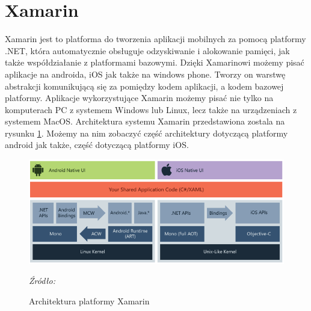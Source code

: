\documentclass[12pt,twoside]{report}
\begin{document}
\section{Xamarin}
Xamarin jest to platforma do tworzenia aplikacji mobilnych za pomocą platformy .NET, która automatycznie obsługuje odzyskiwanie i alokowanie pamięci, jak także współdziałanie z platformami bazowymi. Dzięki Xamarinowi możemy pisać aplikacje na androida, iOS jak także na windows phone. Tworzy on warstwę abstrakcji komunikującą się za pomiędzy kodem aplikacji, a kodem bazowej platformy. Aplikacje wykorzystujące Xamarin możemy pisać nie tylko na komputerach PC z systemem Windows lub Linux, lecz także na urządzeniach z systemem MacOS. Architektura systemu Xamarin przedstawiona zostala na rysunku \ref{XamarinArchitecture}. Możemy na nim zobaczyć część architektury dotyczącą platformy android jak także, część dotyczącą platformy iOS.\cite{XamarinLearn}
\begin{figure}[H]
	\centering
	\includegraphics[scale=0.5]{xamarinArchitecture}
	\caption{Architektura platformy Xamarin}
	\textit{Źródło: \cite{XamarinLearn}}
	\label{XamarinArchitecture}
\end{figure}
\end{document}
